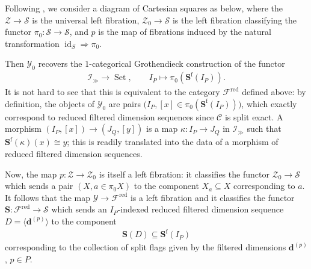 \documentclass[12pt, reqno]{amsart}
\theoremstyle{plain}
\theoremstyle{definition}
\begin{document}
Following \cite{Yuan}, we consider a diagram of Cartesian squares as below, where the $\mathcal{Z}\rightarrow \mathcal{S}$ is the universal left fibration, $\mathcal{Z}_0\rightarrow \mathcal{S}$ is the left fibration classifying the functor $\pi_0\colon \mathcal{S}\rightarrow \mathcal{S}$, and $p$ is the map of fibrations induced by the natural transformation $\operatorname{id}_S\Rightarrow \pi_0$.
\begin{center}
\end{center}

Then $\mathcal{Y}_0$ recovers the $1$-categorical Grothendieck construction of the functor
\begin{align*}
\mathcal{I}_\gg\rightarrow \operatorname{Set},\qquad I_P\mapsto \pi_0 (\mathbf{S}^{\operatorname{f}}(I_P)).
\end{align*}
It is not hard to see that this is equivalent to the category $\mathcal{F}^{\operatorname{red}}$ defined above: by definition, the objects of $\mathcal{Y}_0$ are pairs $\big(I_P, [x]\in \pi_0 (\mathbf{S}^{\operatorname{f}}(I_P))\big)$, which exactly correspond to reduced filtered dimension sequences since $\mathcal{C}$ is split exact. A morphism $(I_P,[x])\rightarrow (J_Q,[y])$ is a map $\kappa\colon I_P\rightarrow J_Q$ in $\mathcal{I}_\gg$ such that $\mathbf{S}^{\operatorname{f}}(\kappa)(x)\cong y$; this is readily translated into the data of a morphism of reduced filtered dimension sequences.

Now, the map $p\colon \mathcal{Z}\rightarrow \mathcal{Z}_0$ is itself a left fibration: it classifies the functor $\mathcal{Z}_0\rightarrow \mathcal{S}$ which sends a pair $(X, a\in \pi_0X)$ to the component $X_a\subseteq X$ corresponding to $a$. It follows that the map $\mathcal{Y}\rightarrow \mathcal{F}^{\operatorname{red}}$ is a left fibration and it classifies the functor $\mathbf{S}\colon \mathcal{F}^{\operatorname{red}}\rightarrow \mathcal{S}$ which sends an $I_P$-indexed reduced filtered dimension sequence $D=\langle \mathbf{d}^{(p)}\rangle$ to the component
\begin{align*}
\mathbf{S}(D) \subseteq \mathbf{S}^{\operatorname{f}}(I_P) 
\end{align*}
corresponding to the collection of split flags given by the filtered dimensions $\mathbf{d}^{(p)}$, $p\in P$.
\end{document}
